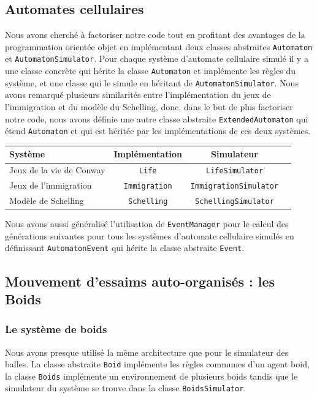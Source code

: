 \documentclass [a4paper,11pt,titlepage] {article}
\begin{document}
\subsection{Automates cellulaires}
Nous avons cherché à factoriser notre code tout en profitant des avantages de la programmation orientée objet en implémentant deux classes abstraites \texttt{Automaton} et \texttt{AutomatonSimulator}. Pour chaque système d'automate cellulaire simulé il y a une classe concrète qui hérite la classe \texttt{Automaton} et implémente les règles du système, et une classe qui le simule en héritant de \texttt{AutomatonSimulator}. Nous avons remarqué plusieurs similarités entre l'implémentation du jeux de l'immigration et du modèle du Schelling, donc, dans le but de plus factoriser notre code, nous avons définie une autre classe abstraite \texttt{ExtendedAutomaton} qui étend \texttt{Automaton} et qui est héritée par les implémentations de ces deux systèmes.

\begin{center}
\begin{tabular}{|l|c|c|c|}
  \hline
    Système & Implémentation & Simulateur \\
  \hline
   Jeux de la vie de Conway & \texttt{Life} & \texttt{LifeSimulator}\\
  \hline
  Jeux de l'immigration & \texttt{Immigration} & \texttt{ImmigrationSimulator}\\
  \hline
  Modèle de Schelling & \texttt{Schelling} & \texttt{SchellingSimulator}\\
  \hline
 
\end{tabular}
\end{center}

Nous avons aussi généralisé l'utilisation de \texttt{EventManager} pour le calcul des générations suivantes pour tous les systèmes d'automate cellulaire simulés en définissant \texttt{AutomatonEvent} qui hérite la classe abstraite \texttt{Event}.


\subsection{Mouvement d’essaims auto-organisés : les Boids}
\subsubsection {Le système de boids}
Nous avons presque utilisé la même architecture que pour le simulateur des balles. La classe abstraite \texttt{Boid} implémente les règles communes d'un agent boid, la classe \texttt{Boids} implémente un environnement de plusieurs boids tandis que le simulateur du système se trouve dans la classe \texttt{BoidsSimulator}. 
\end{document}
